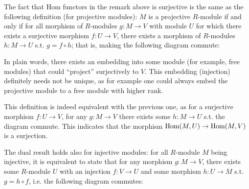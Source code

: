 \begin{remark}\label{rmk:Alt def for projective module}
    The fact that Hom functors in the remark above is surjective is the same as the following definition (for projective modules): $M$ is a projective $R$-module if and only if for all morphism of $R$-modules $g: M \to V$ with module $U$ for which there exists a surjective morphism $f: U \to V$, there exists a morphism of $R$-modules $h: M \to U$ s.t. $g = f \circ h$; that is, making the following diagram commute:
    \begin{figure}[htbp]
        \centering
    \end{figure}

    In plain words, there exists an embedding into some module (for example, free modules) that could ``project'' surjectively to $V$. This embedding (injection) definitely needs not be unique, as for example one could always embed the projective module to a free module with higher rank. 
    
    This definition is indeed equivalent with the previous one, as for a surjective morphism $f: U \to V$, for any $g: M \to V$ there exists some $h: M \to U$ s.t. the diagram commute. This indicates that the morphism $\mathrm{Hom}(M, U) \to \mathrm{Hom}(M, V)$ is a surjection.
    
    The dual result holds also for injective modules: for all $R$-module $M$ being injective, it is equivalent to state that for any morphism $g: M \to V$, there exists some $R$-module $U$ with an injection $f: V \to U$ and some morphism $h: U \to M$ s.t. $g = h \circ f$, i.e. the following diagram commutes:
    \begin{figure}[htbp]
        \centering
    \end{figure}
\end{remark}

